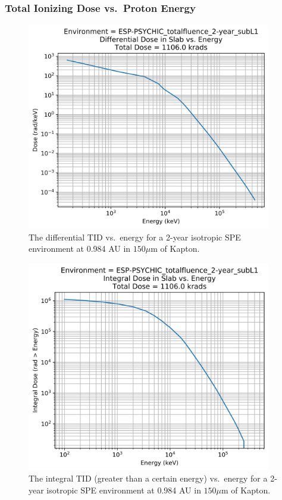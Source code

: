 \documentclass{hitec}
\begin{document}
\clearpage %

\subsubsection{Total Ionizing Dose vs.\ Proton Energy}
\label{sssec:TID-SPE-Dose vs Energy}

\begin{figure}[htbp!]
	\centering
	\includegraphics[width=0.95\textwidth]{../ESP-PSYCHIC_totalfluence_2-year_subL1_Differential_Dose_vs_Energy.png}
	\caption{The differential TID vs.\ energy for a 2-year isotropic SPE environment at 0.984 AU in $150 \mu$m of Kapton.}\label{fig:ESP-PSYCHIC_totalfluence_2-year_subL1_Differential_Dose_vs_Energy}
\end{figure}

\begin{figure}[htbp!]
	\centering
	\includegraphics[width=0.95\textwidth]{../ESP-PSYCHIC_totalfluence_2-year_subL1_Integral_Dose_vs_Energy.png}
	\caption{The integral TID (greater than a certain energy) vs.\ energy for a 2-year isotropic SPE environment at 0.984 AU in $150 \mu$m of Kapton.}\label{fig:ESP-PSYCHIC_totalfluence_2-year_subL1_Integral_Dose_vs_Energy}
\end{figure}
\end{document}
